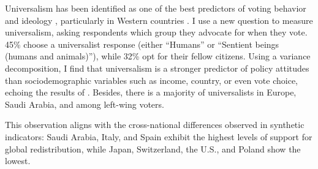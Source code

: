 \documentclass[12pt,english]{article}
\begin{document}
\begin{bibunit}
Universalism has been identified as one of the best predictors of voting behavior \citep{enke_moral_2020} and ideology \citep{enke_moral_2023,cappelen_universalism_2025}, particularly in %
Western countries \citep{cappelen_universalism_2025}. 
I use a new question to measure universalism, asking respondents which group they advocate for when they vote. 45\% choose a universalist response (either ``Humans'' or ``Sentient beings (humans and animals)''), while 32\% opt for their fellow citizens. Using a variance decomposition, I find that universalism is a stronger predictor of policy attitudes than sociodemographic variables such as income, country, or even vote choice, echoing the results of \cite{enke_moral_2023}. %
Besides, there is a majority of universalists in Europe, Saudi Arabia, and among left-wing voters. 

This observation aligns with the cross-national differences observed in synthetic indicators: Saudi Arabia, Italy, and Spain exhibit the highest levels of support for global redistribution, while Japan, Switzerland, the U.S., and Poland show the lowest. 


\end{bibunit}
\end{document}
